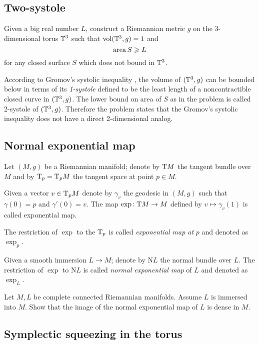 \subsection*{Two-systole}

\begin{pr} Given a big real number $L$,
construct a Riemannian metric $g$ on the 3-dimensional torus $\mathbb{T}^3$ such that $\operatorname{\rm vol}\nolimits(\mathbb{T}^3,g)=1$
and \[\operatorname{\rm area}\nolimits S\geqslant L\]
for any closed surface $S$ which does not bound in $\mathbb{T}^3$.
\end{pr}

According to Gromov's systolic inequality \cite[see][]{gromov-filling}, the volume of $(\mathbb{T}^3,g)$ can be bounded below in terms of its \emph{1-systole} defined to be the least length of a noncontractible closed curve in $(\mathbb{T}^3,g)$.
The lower bound on area of $S$ as in the problem is called 2-systole of $(\mathbb{T}^3,g)$.
Therefore the problem states that the Gromov's systolic inequality does not have a direct 2-dimensional analog.

\subsection*{Normal exponential map\easy}
\label{Normal exponential map}
\label{page:Normal exponential map}

Let $(M,g)$ be a Riemannian manifold;
denote by $\mathrm{T} M$ the tangent bundle over $M$ and by $\mathrm{T}_p=\mathrm{T}_pM$ the tangent space at point $p\in M$.

Given a vector $v\in\mathrm{T}_pM$ denote by $\gamma_v$ the geodesic in $(M,g)$
such that $\gamma(0)=p$ and $\gamma'(0)=v$.
The map $\exp\colon\mathrm{T} M\to M$ defined by $v\mapsto \gamma_v(1)$ is called exponential map.

The restriction of $\exp$ to the $\mathrm{T}_p$ is called \emph{exponential map at} $p$ and denoted as $\exp_p$.

Given a smooth immersion $L\to M$;
denote by $\mathrm{N} L$ the normal bundle over $L$.
The restriction of $\exp$ to $\mathrm{N} L$ is called {}\emph{normal exponential map} of $L$ and denoted as $\exp_L$.

\begin{pr}
Let $M,L$ be complete connected Riemannian manifolds.
Assume $L$ is immersed into $M$.
Show that the image  of the 
normal exponential map of $L$ is dense in $M$.
\end{pr}

\subsection*{Symplectic squeezing in the torus}
\label{Symplectic squeezing in the torus}



